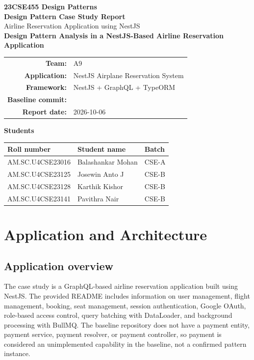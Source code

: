 \documentclass[11pt,a4paper]{article}
\newcommand{\code}[1]{\texttt{\small\detokenize{#1}}}
\begin{document}
\begin{titlepage}
\centering
\vspace*{18mm}
{\Large\textbf{23CSE455 Design Patterns}}\\[8mm]
{\LARGE\textbf{Design Pattern Case Study Report}}\\[5mm]
{\Large Airline Reservation Application using NestJS}\\[12mm]
{\large\textbf{Design Pattern Analysis in a NestJS-Based Airline Reservation Application}}\\[18mm]
\begin{tabular}{rl}
\textbf{Team:} & A9\\
\textbf{Application:} & NestJS Airplane Reservation System\\
\textbf{Framework:} & NestJS + GraphQL + TypeORM\\
\textbf{Baseline commit:} & \code{ae2c24869377ce2f7a29022cd237d808338156ea}\\
\textbf{Report date:} & 2026-10-06\\
\end{tabular}
\vfill
\textbf{Students}\\[4mm]
\begin{tabular}{lll}
\toprule
Roll number & Student name & Batch\\
\midrule
AM.SC.U4CSE23016 & Balashankar Mohan & CSE-A\\
AM.SC.U4CSE23125 & Josewin Anto J & CSE-B\\
AM.SC.U4CSE23128 & Karthik Kishor & CSE-B\\
AM.SC.U4CSE23141 & Pavithra Nair & CSE-B\\
\bottomrule
\end{tabular}
\vfill

\end{titlepage}


\newpage

\section{Application and Architecture}

\subsection{Application overview}
The case study is a GraphQL-based airline reservation application built using NestJS. The provided README includes information on user management, flight management, booking, seat management, session authentication, Google OAuth, role-based access control, query batching with DataLoader, and background processing with BullMQ. The baseline repository does not have a payment entity, payment service, payment resolver, or payment controller, so payment is considered an unimplemented capability in the baseline, not a confirmed pattern instance.
\end{document}
